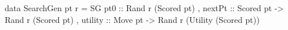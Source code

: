 data SearchGen pt r = 
 SG { pt0     :: Rand r (Scored pt)
    , nextPt  :: Scored pt -> Rand r (Scored pt)
    , utility :: Move pt -> Rand r (Utility (Scored pt))
    }

